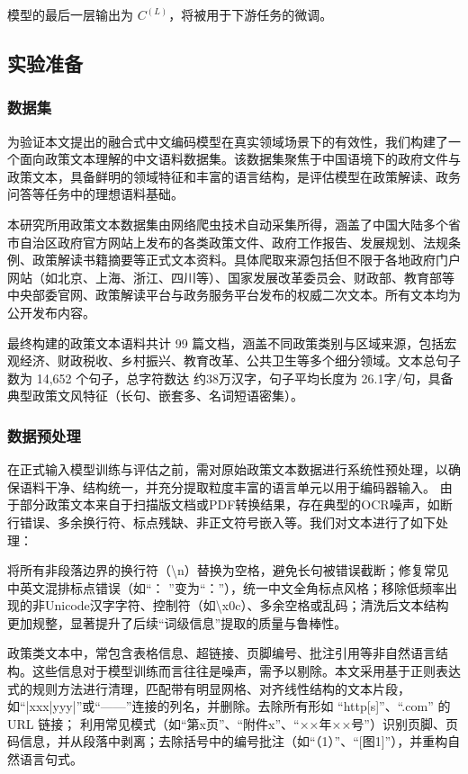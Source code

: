 \documentclass[12pt, a4paper]{ctexart}
\begin{document}
模型的最后一层输出为 $C^{(L)}$，将被用于下游任务的微调。

\subsection{实验准备}
\subsubsection{数据集}
为验证本文提出的融合式中文编码模型在真实领域场景下的有效性，我们构建了一个面向政策文本理解的中文语料数据集。该数据集聚焦于中国语境下的政府文件与政策文本，具备鲜明的领域特征和丰富的语言结构，是评估模型在政策解读、政务问答等任务中的理想语料基础。

本研究所用政策文本数据集由网络爬虫技术自动采集所得，涵盖了中国大陆多个省市自治区政府官方网站上发布的各类政策文件、政府工作报告、发展规划、法规条例、政策解读书籍摘要等正式文本资料。具体爬取来源包括但不限于各地政府门户网站（如北京、上海、浙江、四川等）、国家发展改革委员会、财政部、教育部等中央部委官网、政策解读平台与政务服务平台发布的权威二次文本。所有文本均为公开发布内容。

最终构建的政策文本语料共计 99 篇文档，涵盖不同政策类别与区域来源，包括宏观经济、财政税收、乡村振兴、教育改革、公共卫生等多个细分领域。文本总句子数为 14,652 个句子，总字符数达 约38万汉字，句子平均长度为 26.1字/句，具备典型政策文风特征（长句、嵌套多、名词短语密集）。

\subsubsection{数据预处理}
在正式输入模型训练与评估之前，需对原始政策文本数据进行系统性预处理，以确保语料干净、结构统一，并充分提取粒度丰富的语言单元以用于编码器输入。
由于部分政策文本来自于扫描版文档或PDF转换结果，存在典型的OCR噪声，如断行错误、多余换行符、标点残缺、非正文符号嵌入等。我们对文本进行了如下处理：

将所有非段落边界的换行符（\textbackslash n）替换为空格，避免长句被错误截断；修复常见中英文混排标点错误（如“： ”变为“：”），统一中文全角标点风格；移除低频率出现的非Unicode汉字字符、控制符（如\textbackslash x0c）、多余空格或乱码；清洗后文本结构更加规整，显著提升了后续“词级信息”提取的质量与鲁棒性。

政策类文本中，常包含表格信息、超链接、页脚编号、批注引用等非自然语言结构。这些信息对于模型训练而言往往是噪声，需予以剔除。本文采用基于正则表达式的规则方法进行清理，匹配带有明显网格、对齐线性结构的文本片段，如“|xxx|yyy|”或“——”连接的列名，并删除。去除所有形如 “http[s]”、“.com” 的 URL 链接；
利用常见模式（如“第x页”、“附件x”、“××年××号”）识别页脚、页码信息，并从段落中剥离；去除括号中的编号批注（如“（1）”、“[图1]”），并重构自然语言句式。
\end{document}
